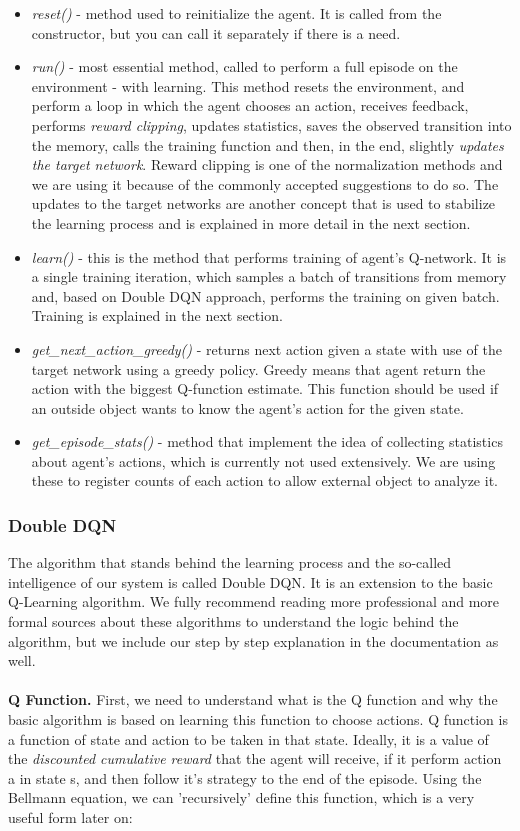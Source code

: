 \documentclass{article}
\begin{document}
\begin{itemize}
\item \textit{reset()} - method used to reinitialize the agent. It is called from the constructor, but you can call it separately if there is a need.
\item \textit{run()} - most essential method, called to perform a full episode on the environment - with learning. This method resets the environment, and perform a loop in which the agent chooses an action, receives feedback, performs \textit{reward clipping}, updates statistics, saves the observed transition into the memory, calls the training function and then, in the end, slightly \textit{updates the target network}. Reward clipping is one of the normalization methods and we are using it because of the commonly accepted suggestions to do so. The updates to the target networks are another concept that is used to stabilize the learning process and is explained in more detail in the next section.
\item \textit{learn()} - this is the method that performs training of agent's Q-network. It is a single training iteration, which samples a batch of transitions from memory and, based on Double DQN approach, performs the training on given batch. Training is explained in the next section. 
\item \textit{get\_next\_action\_greedy()} - returns next action given a state with use of the target network using a greedy policy. Greedy means that agent return the action with the biggest Q-function estimate. This function should be used if an outside object wants to know the agent's action for the given state.
\item \textit{get\_episode\_stats()} - method that implement the idea of collecting statistics about agent's actions, which is currently not used extensively. We are using these to register counts of each action to allow external object to analyze it.
\end{itemize}

\subsubsection{Double DQN}

The algorithm that stands behind the learning process and the so-called intelligence of our system is called Double DQN. It is an extension to the basic Q-Learning algorithm. We fully recommend reading more professional and more formal sources about these algorithms to understand the logic behind the algorithm, but we include our step by step explanation in the documentation as well.
\\\\
\textbf{Q Function.} First, we need to understand what is the Q function and why the basic algorithm is based on learning this function to choose actions. Q function is a function of state and action to be taken in that state. Ideally, it is a value of the \textit{discounted cumulative reward} that the agent will receive, if it perform action a in state s, and then follow it's strategy to the end of the episode. Using the Bellmann equation, we can 'recursively' define this function, which is a very useful form later on:
\end{document}
